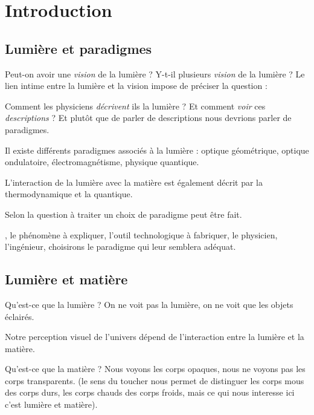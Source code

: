 \chapter{Introduction}


\section{Lumière et paradigmes}

Peut-on avoir une {\it vision} de la lumière ? Y-t-il plusieurs {\it vision} de la lumière ? Le lien intime entre la lumière et la vision impose de préciser la question : 

Comment les physiciens {\it décrivent} ils la lumière ? Et comment {\it voir} ces {\it descriptions} ? Et plutôt que de parler de descriptions nous devrions parler de paradigmes.

Il existe différents paradigmes associés à la lumière : optique géométrique, optique ondulatoire, électromagnétisme, physique quantique.

L'interaction de la lumière avec la matière est également décrit par la thermodynamique et la quantique.



Selon la question à traiter un choix de paradigme peut être fait.

, le phénomène à expliquer, l'outil technologique à fabriquer, le physicien, l'ingénieur, choisirons le paradigme qui leur semblera adéquat.


\section{Lumière et matière}

Qu'est-ce que la lumière ? On ne voit pas la lumière, on ne voit que les objets éclairés.

Notre perception visuel de l'univers dépend de l'interaction entre la lumière et la matière.

Qu'est-ce que la matière ? Nous voyons les corps opaques, nous ne voyons pas les corps transparents.
(le sens du toucher nous permet de distinguer les corps mous des corps durs, les corps chauds des corps froids, mais ce qui nous interesse ici c'est lumière et matière). 


